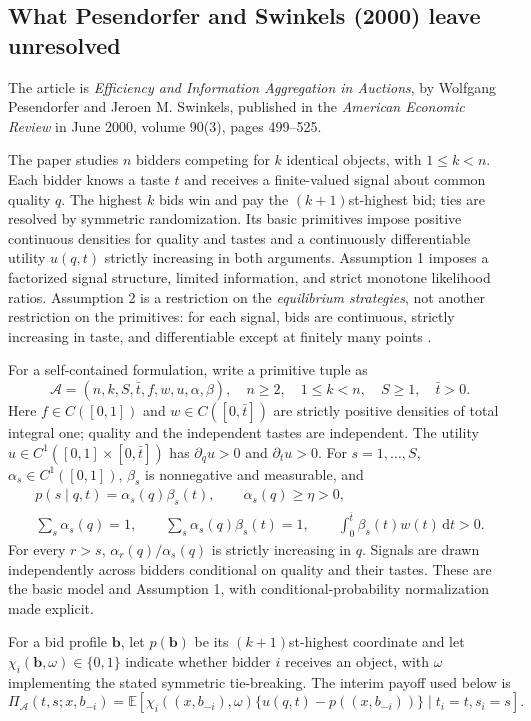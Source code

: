 \documentclass[11pt,a4paper]{article}
\numberwithin{equation}{section}
\theoremstyle{definition}
\theoremstyle{remark}
\newcommand{\E}{\mathbb E}
\newcommand{\dd}{\,\mathrm d}
\begin{document}
\subsection{What Pesendorfer and Swinkels (2000) leave unresolved}
The article is \emph{Efficiency and Information Aggregation in Auctions}, by Wolfgang Pesendorfer and Jeroen M. Swinkels, published in the \emph{American Economic Review} in June 2000, volume 90(3), pages 499--525.

The paper studies $n$ bidders competing for $k$ identical objects, with $1\le k<n$. Each bidder knows a taste $t$ and receives a finite-valued signal about common quality $q$. The highest $k$ bids win and pay the $(k+1)$st-highest bid; ties are resolved by symmetric randomization. Its basic primitives impose positive continuous densities for quality and tastes and a continuously differentiable utility $u(q,t)$ strictly increasing in both arguments. Assumption 1 imposes a factorized signal structure, limited information, and strict monotone likelihood ratios. Assumption 2 is a restriction on the \emph{equilibrium strategies}, not another restriction on the primitives: for each signal, bids are continuous, strictly increasing in taste, and differentiable except at finitely many points \cite[pp.~502--503]{PS2000}.

For a self-contained formulation, write a primitive tuple as
\[
 \mathcal A=(n,k,S,\bar t,f,w,u,\alpha,\beta),
 \quad n\ge2,\quad 1\le k<n,\quad S\ge1,\quad\bar t>0.
\]
Here $f\in C([0,1])$ and $w\in C([0,\bar t])$ are strictly positive densities of total integral one; quality and the independent tastes are independent. The utility $u\in C^1([0,1]\times[0,\bar t])$ has $\partial_qu>0$ and $\partial_tu>0$. For $s=1,\dots,S$, $\alpha_s\in C^1([0,1])$, $\beta_s$ is nonnegative and measurable, and
\begin{gather*}
 p(s\mid q,t)=\alpha_s(q)\beta_s(t),\qquad
 \alpha_s(q)\ge\eta>0,\\
 \sum_s\alpha_s(q)=1,\qquad
 \sum_s\alpha_s(q)\beta_s(t)=1,\qquad
 \int_0^{\bar t}\beta_s(t)w(t)\dd t>0.
\end{gather*}
For every $r>s$, $\alpha_r(q)/\alpha_s(q)$ is strictly increasing in $q$. Signals are drawn independently across bidders conditional on quality and their tastes. These are the basic model and Assumption 1, with conditional-probability normalization made explicit.

For a bid profile $\mathbf b$, let $p(\mathbf b)$ be its $(k+1)$st-highest coordinate and let $\chi_i(\mathbf b,\omega)\in\{0,1\}$ indicate whether bidder $i$ receives an object, with $\omega$ implementing the stated symmetric tie-breaking. The interim payoff used below is
\[
 \Pi_{\mathcal A}(t,s;x,b_{-i})
 =\E\!\left[\chi_i((x,b_{-i}),\omega)
 \{u(q,t)-p((x,b_{-i}))\}\mid t_i=t,s_i=s\right].
\]
\end{document}

